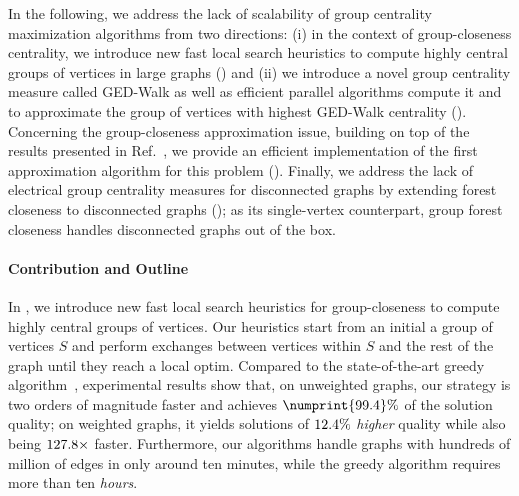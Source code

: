 In the following, we address the lack of scalability of group centrality
maximization algorithms from two directions: (i) in the context of
group-closeness centrality, we introduce new fast local search heuristics to
compute highly central groups of vertices in large graphs
() and (ii) we introduce a novel
group centrality measure called GED-Walk as well as efficient parallel
algorithms compute it and to approximate the group of vertices with highest
GED-Walk centrality ().
%
Concerning the group-closeness approximation issue, building on top of the
results presented in Ref.~\cite{DBLP:conf/alenex/AngrimanBDGGM21}, we provide
an efficient implementation of the first approximation algorithm for this
problem (). Finally, we address the lack of
electrical group centrality measures for disconnected graphs by extending
forest closeness to disconnected graphs (); as its
single-vertex counterpart, group forest closeness handles disconnected graphs
out of the box.

\paragraph{Contribution and Outline}
In , we introduce new fast local search
heuristics for group-closeness to compute highly central groups of vertices.
Our heuristics start from an initial a group of vertices $S$ and perform
exchanges between vertices within $S$ and the rest of the graph until they
reach a local optim. Compared to the state-of-the-art greedy
algorithm~\cite{DBLP:conf/alenex/BergaminiGM18}, experimental results show
that, on unweighted graphs, our strategy is two orders of magnitude faster and
achieves $\numprint{99.4}\%$ of the solution quality; on weighted graphs, it
yields solutions of $\onedigit{\wGSQualInc}\%$ \emph{higher} quality while also
being $\onedigit{\gsPSevenFiveKSpeed}\times$ faster.
Furthermore, our algorithms handle graphs with hundreds of million of edges
in only around ten minutes, while the greedy algorithm requires more than
ten \emph{hours}.

